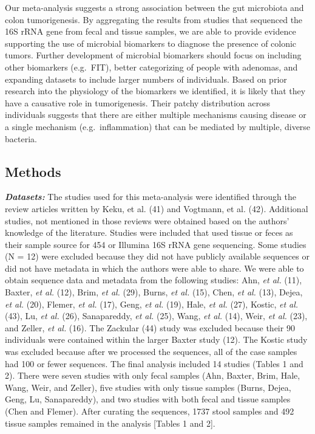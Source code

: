 \documentclass[12pt,]{article}
\begin{document}
Our meta-analysis suggests a strong association between the gut
microbiota and colon tumorigenesis. By aggregating the results from
studies that sequenced the 16S rRNA gene from fecal and tissue samples,
we are able to provide evidence supporting the use of microbial
biomarkers to diagnose the presence of colonic tumors. Further
development of microbial biomarkers should focus on including other
biomarkers (e.g.~FIT), better categorizing of people with adenomas, and
expanding datasets to include larger numbers of individuals. Based on
prior research into the physiology of the biomarkers we identified, it
is likely that they have a causative role in tumorigenesis. Their patchy
distribution across individuals suggests that there are either multiple
mechanisms causing disease or a single mechanism (e.g.~inflammation)
that can be mediated by multiple, diverse bacteria.

\newpage

\subsection{Methods}\label{methods}

\textbf{\emph{Datasets:}} The studies used for this meta-analysis were
identified through the review articles written by Keku, et al. (41) and
Vogtmann, et al. (42). Additional studies, not mentioned in those
reviews were obtained based on the authors' knowledge of the literature.
Studies were included that used tissue or feces as their sample source
for 454 or Illumina 16S rRNA gene sequencing. Some studies (N = 12) were
excluded because they did not have publicly available sequences or did
not have metadata in which the authors were able to share. We were able
to obtain sequence data and metadata from the following studies: Ahn,
\emph{et al.} (11), Baxter, \emph{et al.} (12), Brim, \emph{et al.}
(29), Burns, \emph{et al.} (15), Chen, \emph{et al.} (13), Dejea,
\emph{et al.} (20), Flemer, \emph{et al.} (17), Geng, \emph{et al.}
(19), Hale, \emph{et al.} (27), Kostic, \emph{et al.} (43), Lu, \emph{et
al.} (26), Sanapareddy, \emph{et al.} (25), Wang, \emph{et al.} (14),
Weir, \emph{et al.} (23), and Zeller, \emph{et al.} (16). The Zackular
(44) study was excluded because their 90 individuals were contained
within the larger Baxter study (12). The Kostic study was excluded
because after we processed the sequences, all of the case samples had
100 or fewer sequences. The final analysis included 14 studies (Tables 1
and 2). There were seven studies with only fecal samples (Ahn, Baxter,
Brim, Hale, Wang, Weir, and Zeller), five studies with only tissue
samples (Burns, Dejea, Geng, Lu, Sanapareddy), and two studies with both
fecal and tissue samples (Chen and Flemer). After curating the
sequences, 1737 stool samples and 492 tissue samples remained in the
analysis {[}Tables 1 and 2{]}.
\end{document}
